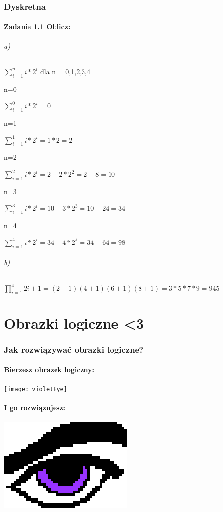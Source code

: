 \documentclass[12pt]{article}
\begin{document}
\section{Dyskretna}
\subsection{Zadanie 1.1 Oblicz:}

\paragraph{a)}
$\sum_{i=1}^{n}i*2^i$ dla n = 0,1,2,3,4
\subparagraph{n=0}
$\sum_{i=1}^{0}i*2^i=0$ 
\subparagraph{n=1}
$\sum_{i=1}^{1}i*2^i=1*2=2$
\subparagraph{n=2}
$\sum_{i=1}^{2}i*2^i=2+2*2^2=2+8=10$
\subparagraph{n=3}
$\sum_{i=1}^{3}i*2^i=10+3*2^3=10+24=34$
\subparagraph{n=4}
$\sum_{i=1}^{4}i*2^i=34+4*2^4=34+64=98$

\paragraph{b)}
$\prod_{i=1}^{4}2i+1=(2+1)(4+1)(6+1)(8+1)=3*5*7*9=945$

\newpage
\part{Obrazki logiczne \textless3}
\section{Jak rozwiązywać obrazki logiczne?}
\subsection{Bierzesz obrazek logiczny\cite{Violet}:}
\texttt{[image: violetEye]}
\subsection{I go rozwiązujesz\cite{Ardna}:}
\includegraphics{violetEyeSolved}
\end{document}
